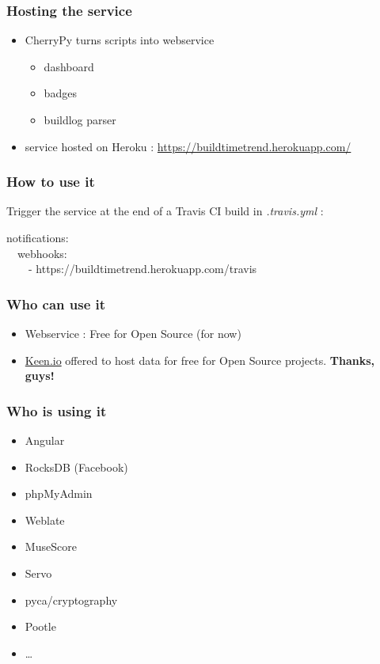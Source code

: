 \documentclass[14pt]{beamer}
\begin{document}
  \begin{frame}
    \frametitle{Hosting the service}
    \begin{itemize}
      \item CherryPy turns scripts into webservice
        \begin{itemize}
          \item dashboard
          \item badges
          \item buildlog parser
        \end{itemize}
      \item service hosted on Heroku : \href{https://buildtimetrend.herokuapp.com/}{https://buildtimetrend.herokuapp.com/}
    \end{itemize}
  \end{frame}
  \begin{frame}
    \frametitle{How to use it}
    Trigger the service at the end of a Travis CI build in \textit{.travis.yml} :
    \begin{example}
      \small{notifications:\\
      \ \ webhooks:\\
      \ \ \ \ - https://buildtimetrend.herokuapp.com/travis}
    \end{example}
  \end{frame}
  \begin{frame}
    \frametitle{Who can use it}
    \begin{itemize}
      \item Webservice : Free for Open Source (for now)
      \item \href{https://keen.io}{Keen.io} offered to host data for free for Open Source projects. \textbf{Thanks, guys!}
    \end{itemize}
  \end{frame}
  \begin{frame}
    \frametitle{Who is using it}
    \begin{itemize}
      \item Angular
      \item RocksDB (Facebook)
      \item phpMyAdmin
      \item Weblate
      \item MuseScore
      \item Servo
      \item pyca/cryptography
      \item Pootle
      \item \ldots
    \end{itemize}
  \end{frame}
\end{document}
